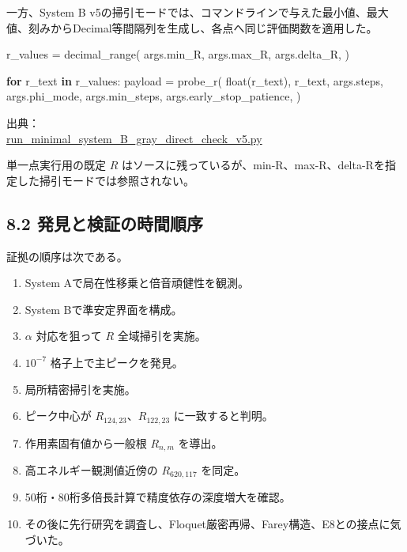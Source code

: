 \documentclass[
  10pt,
  a4paper,
]{article}
\newenvironment{Shaded}{}{}
\newcommand{\BuiltInTok}[1]{\textcolor[rgb]{0.00,0.50,0.00}{#1}}
\newcommand{\ControlFlowTok}[1]{\textcolor[rgb]{0.00,0.44,0.13}{\textbf{#1}}}
\newcommand{\KeywordTok}[1]{\textcolor[rgb]{0.00,0.44,0.13}{\textbf{#1}}}
\newcommand{\NormalTok}[1]{#1}
\newcommand{\OperatorTok}[1]{\textcolor[rgb]{0.40,0.40,0.40}{#1}}
\providecommand{\tightlist}{%
  \setlength{\itemsep}{0pt}\setlength{\parskip}{0pt}}
\begin{document}
一方、System B
v5の掃引モードでは、コマンドラインで与えた最小値、最大値、刻みからDecimal等間隔列を生成し、各点へ同じ評価関数を適用した。

\begin{Shaded}
\begin{Highlighting}[]
\NormalTok{r\_values }\OperatorTok{=}\NormalTok{ decimal\_range(}
\NormalTok{    args.min\_R,}
\NormalTok{    args.max\_R,}
\NormalTok{    args.delta\_R,}
\NormalTok{)}

\ControlFlowTok{for}\NormalTok{ r\_text }\KeywordTok{in}\NormalTok{ r\_values:}
\NormalTok{    payload }\OperatorTok{=}\NormalTok{ probe\_r(}
        \BuiltInTok{float}\NormalTok{(r\_text),}
\NormalTok{        r\_text,}
\NormalTok{        args.steps,}
\NormalTok{        args.phi\_mode,}
\NormalTok{        args.min\_steps,}
\NormalTok{        args.early\_stop\_patience,}
\NormalTok{    )}
\end{Highlighting}
\end{Shaded}

出典：\\
\href{../20260715/run_minimal_system_B_gray_direct_check_v5.py\#L228-L270}{run\_minimal\_system\_B\_gray\_direct\_check\_v5.py}

単一点実行用の既定 \(R\)
はソースに残っているが、min-R、max-R、delta-Rを指定した掃引モードでは参照されない。

\subsection{8.2
発見と検証の時間順序}\label{ux767aux898bux3068ux691cux8a3cux306eux6642ux9593ux9806ux5e8f}

証拠の順序は次である。

\begin{enumerate}
\def\labelenumi{\arabic{enumi}.}
\tightlist
\item
  System Aで局在性移乗と倍音頑健性を観測。
\item
  System Bで準安定界面を構成。
\item
  \(\alpha\) 対応を狙って \(R\) 全域掃引を実施。
\item
  \(10^{-7}\) 格子上で主ピークを発見。
\item
  局所精密掃引を実施。
\item
  ピーク中心が \(R_{124,23}\)、\(R_{122,23}\) に一致すると判明。
\item
  作用素固有値から一般根 \(R_{n,m}\) を導出。
\item
  高エネルギー観測値近傍の \(R_{620,117}\) を同定。
\item
  50桁・80桁多倍長計算で精度依存の深度増大を確認。
\item
  その後に先行研究を調査し、Floquet厳密再帰、Farey構造、E8との接点に気づいた。
\end{enumerate}
\end{document}
